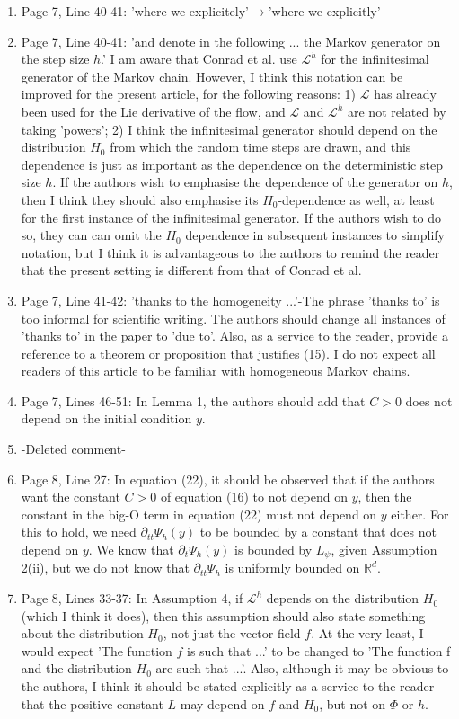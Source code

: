 \documentclass{article}
\begin{document}
\begin{enumerate}[label=(\arabic*)]
		\item Page 7, Line 40-41: 'where we explicitely'$\to$'where we explicitly'
		\item Page 7, Line 40-41: 'and denote in the following ... the Markov generator on the step size $h$.' I am aware that Conrad et al. use $\mathcal{L}^h$ for the infinitesimal generator of the Markov chain. However, I think this notation can be improved for the present article, for the following reasons: 1) $\mathcal{L}$ has already been used for the Lie derivative of the flow, and $\mathcal{L}$ and $\mathcal{L}^h$ are not related by taking 'powers'; 2) I think the infinitesimal generator should depend on the distribution $H_0$ from which the random time steps are drawn, and this dependence is just as important as the dependence on the deterministic step size $h$. If the authors wish to emphasise the dependence of the generator on $h$, then I think they should also emphasise its $H_0$-dependence as well, at least for the first instance of the infinitesimal generator. If the authors wish to do so, they can can omit the $H_0$ dependence in subsequent instances to simplify notation, but I think it is advantageous to the authors to remind the reader that the present setting is different from that of Conrad et al.
		\item Page 7, Line 41-42: 'thanks to the homogeneity ...'-The phrase 'thanks to' is too informal for scientific writing. The authors should change all instances of 'thanks to' in the paper to 'due to'. Also, as a service to the reader, provide a reference to a theorem or proposition that justifies (15). I do not expect all readers of this article to be familiar with homogeneous Markov chains.
		\item Page 7, Lines 46-51: In Lemma 1, the authors should add that $C>0$ does not depend on the initial condition $y$.
		\item -Deleted comment-
		\item Page 8, Line 27: In equation (22), it should be observed that if the authors want the constant $C>0$ of equation (16) to not depend on $y$, then the constant in the big-O term in equation (22) must not depend on $y$ either. For this to hold, we need $\partial_{tt}\Psi_h(y)$ to be bounded by a constant that does not depend on $y$. We know that $\partial_t\Psi_h(y)$ is bounded by $L_\psi$, given Assumption 2(ii), but we do not know that $\partial_{tt}\Psi_h$ is uniformly bounded on $\mathbb{R}^d$. 
		\item Page 8, Lines 33-37: In Assumption 4, if $\mathcal{L}^h$ depends on the distribution $H_0$ (which I think it does), then this assumption should also state something about the distribution $H_0$, not just the vector field $f$. At the very least, I would expect 'The function $f$ is such that ...' to be changed to 'The function f and the distribution $H_0$ are such that ...'. Also, although it may be obvious to the authors, I think it should be stated explicitly as a service to the reader that the positive constant $L$ may depend on $f$ and $H_0$, but not on $\Phi$ or $h$.

\end{enumerate}
\end{document}
